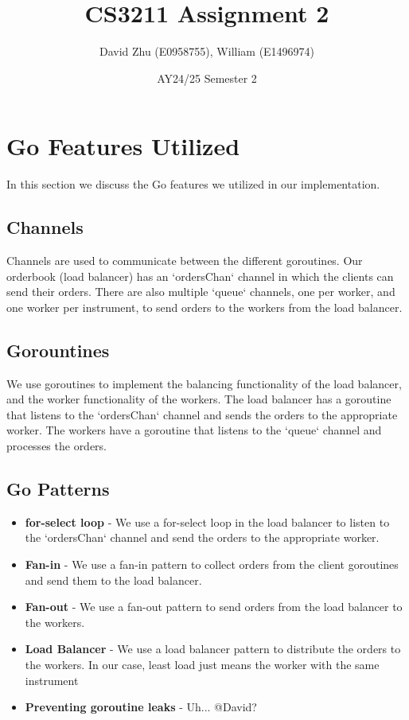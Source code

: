\documentclass[11pt]{article}
\title{CS3211 Assignment 2}
\author{David Zhu (E0958755), William (E1496974)}
\date{AY24/25 Semester 2}
\begin{document}
\maketitle

\section{Go Features Utilized}

In this section we discuss the Go features we utilized in our implementation.

\subsection{Channels}

Channels are used to communicate between the different goroutines. Our orderbook (load balancer) has an `ordersChan` channel in which the clients can send their orders.
There are also multiple `queue` channels, one per worker, and one worker per instrument, to send orders to the workers from the load balancer.

\subsection{Gorountines}

We use goroutines to implement the balancing functionality of the load balancer, and the worker functionality of the workers. 
The load balancer has a goroutine that listens to the `ordersChan` channel and sends the orders to the appropriate worker. 
The workers have a goroutine that listens to the `queue` channel and processes the orders.

\subsection{Go Patterns}

\begin{itemize}

\item \textbf{for-select loop} - We use a for-select loop in the load balancer to listen to the `ordersChan` channel and send the orders to the appropriate worker.
\item \textbf{Fan-in} - We use a fan-in pattern to collect orders from the client goroutines and send them to the load balancer.
\item \textbf{Fan-out} - We use a fan-out pattern to send orders from the load balancer to the workers.
\item \textbf{Load Balancer} - We use a load balancer pattern to distribute the orders to the workers. In our case, least load just means the worker with the same instrument
\item \textbf{Preventing goroutine leaks} - Uh... @David?

\end{itemize}
\end{document}
